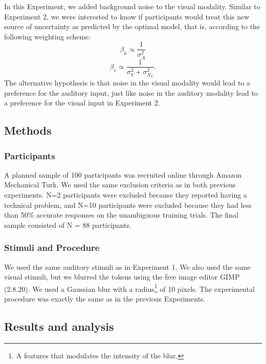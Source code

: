 \documentclass[english,floatsintext,man]{apa6}
\theoremstyle{definition}
\theoremstyle{definition}
\theoremstyle{definition}
\theoremstyle{remark}
\begin{document}
In this Experiment, we added background noise to the visual modality.
Similar to Experiment 2, we were interested to know if participants
would treat this new source of uncertainty as predicted by the optimal
model, that is, according to the following weighting scheme:
\[\beta_a \propto \frac{1}{\sigma^2_{A}}\]
\[\beta_v \propto \frac{1}{\sigma^2_{V}+\sigma^2_{N_V}}.\] The
alternative hypothesis is that noise in the visual modality would lead
to a preference for the auditory input, just like noise in the auditory
modality lead to a preference for the visual input in Experiment 2.

\subsection{Methods}\label{methods-2}

\subsubsection{Participants}\label{participants-2}

A planned sample of 100 participants was recruited online through Amazon
Mechanical Turk. We used the same exclusion criteria as in both previous
experiments. N=2 participants were excluded because they reported having
a technical problem, and N=10 participants were excluded because they
had less than 50\% accurate responses on the unambiguous training
trials. The final sample consisted of N = 88 participants.

\subsubsection{Stimuli and Procedure}\label{stimuli-and-procedure-1}

We used the same auditory stimuli as in Experiment 1. We also used the
same visual stimuli, but we blurred the tokens using the free image
editor GIMP (2.8.20). We used a Gaussian blur with a
radius\footnote{A features that modulates the intensity of the blur.} of
10 pixels. The experimental procedure was exactly the same as in the
previous Experiments.

\subsection{Results and analysis}\label{results-and-analysis-2}
\end{document}
